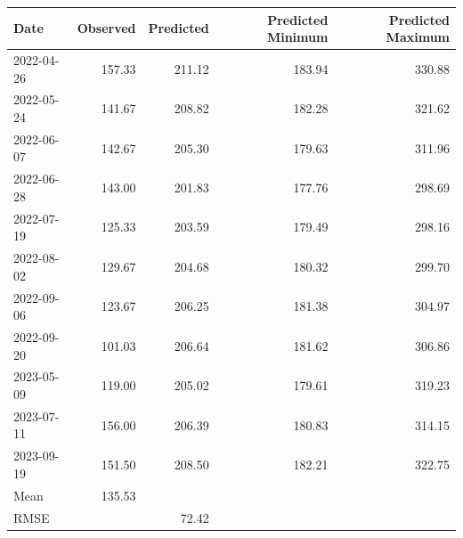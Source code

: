 \begin{table}[ht]
\centering
\begin{tabular}{lrrrr}
  \hline
Date & Observed & Predicted & Predicted Minimum & Predicted Maximum \\ 
  \hline
2022-04-26 & 157.33 & 211.12 & 183.94 & 330.88 \\ 
  2022-05-24 & 141.67 & 208.82 & 182.28 & 321.62 \\ 
  2022-06-07 & 142.67 & 205.30 & 179.63 & 311.96 \\ 
  2022-06-28 & 143.00 & 201.83 & 177.76 & 298.69 \\ 
  2022-07-19 & 125.33 & 203.59 & 179.49 & 298.16 \\ 
  2022-08-02 & 129.67 & 204.68 & 180.32 & 299.70 \\ 
  2022-09-06 & 123.67 & 206.25 & 181.38 & 304.97 \\ 
  2022-09-20 & 101.03 & 206.64 & 181.62 & 306.86 \\ 
  2023-05-09 & 119.00 & 205.02 & 179.61 & 319.23 \\ 
  2023-07-11 & 156.00 & 206.39 & 180.83 & 314.15 \\ 
  2023-09-19 & 151.50 & 208.50 & 182.21 & 322.75 \\ 
  Mean & 135.53 &  &  &  \\ 
  RMSE &  & 72.42 &  &  \\ 
   \hline
\end{tabular}
\end{table}

